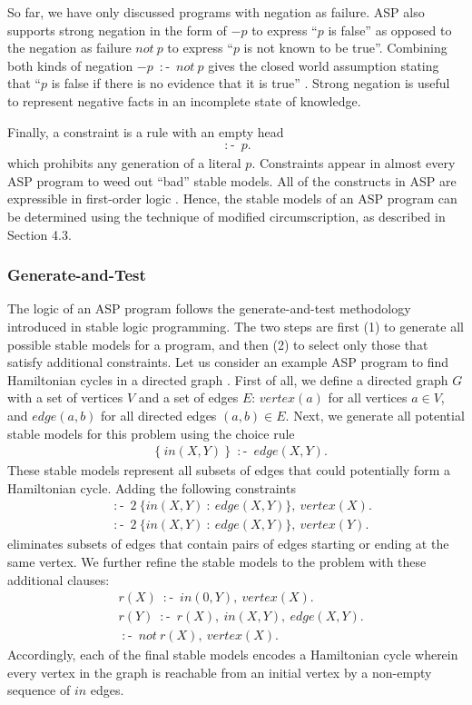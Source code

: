 So far, we have only discussed programs with negation as failure. ASP also supports 
strong negation in the form of $-p$ to express ``$p$ is false'' as opposed to 
the negation as failure $not \: p$ to express ``$p$ is not known to be true''. Combining 
both kinds of negation $-p \: \mathop{:\!\!-} \: not \: p$ gives the closed world assumption 
stating that ``$p$ is false if there is no evidence that it is true'' \cite{ferraris}. Strong negation 
is useful to represent negative facts in an incomplete state of knowledge.

Finally, a constraint is a rule with an empty head 
\begin{align*}
    \mathop{:\!\!-} \: p.
\end{align*}
which prohibits 
any generation of a literal $p$. Constraints appear in almost every ASP program to weed out 
``bad'' stable models. All of the constructs in ASP are expressible in first-order 
logic \cite{lifschitz1}. Hence, the stable models of an ASP program can be determined using the 
technique of modified circumscription, as described in Section 4.3.

\subsubsection{Generate-and-Test}
The logic of an ASP program follows the generate-and-test methodology introduced in 
stable logic programming. The two steps are first (1) to generate all possible stable models 
for a program, and then (2) to select only those that satisfy additional constraints. Let us 
consider an example ASP program to find Hamiltonian cycles in a directed graph \cite{lifschitz0}. First of all, 
we define a directed graph $G$ with a set of vertices $V$ and a set of edges $E$: 
$vertex(a)$ for all vertices $a \in V$, and $edge(a,b)$ for all directed edges $(a,b) \in E$. Next, 
we generate all potential stable models for this problem using the choice rule 
\begin{align*}
    & \{ \: in(X,Y) \: \} \: \mathop{:\!\!-} \: edge(X,Y). 
\end{align*}
These stable models represent all subsets of edges that could potentially form a Hamiltonian 
cycle. Adding the following constraints 
\begin{align*}
    & \mathop{:\!\!-} \: 2 \: \{in(X,Y) \: : \: edge(X,Y)\}, \: vertex(X). \\
    & \mathop{:\!\!-} \: 2 \: \{in(X,Y) \: : \: edge(X,Y)\}, \: vertex(Y). 
\end{align*}
eliminates subsets of edges that contain pairs of edges starting or ending at the same 
vertex. We further refine the stable models to the problem with these additional clauses: 
\begin{align*}
    & r(X) \: \mathop{:\!\!-} \: in(0,Y), \: vertex(X).\\
    & r(Y) \: \mathop{:\!\!-} \: r(X), \: in(X,Y), \: edge(X,Y). \\ 
    & \mathop{:\!\!-} \: not \: r(X), \: vertex(X).
\end{align*}
Accordingly, each of the final stable models encodes a Hamiltonian cycle wherein every vertex in the graph 
is reachable from an initial 
vertex by a non-empty sequence of $in$ edges.

